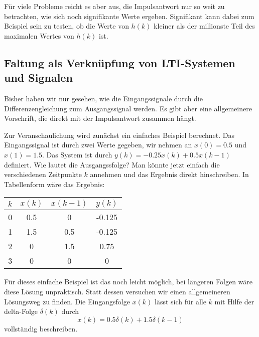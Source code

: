 Für viele Probleme reicht es aber aus, die Impulsantwort nur so
weit zu betrachten, wie sich noch signifikante Werte ergeben.
Signifikant kann dabei zum Beispiel sein zu testen, ob die Werte
von $h(k)$ kleiner als der millionste Teil des maximalen Wertes
von $h(k)$ ist.



\subsection{Faltung als Verknüpfung von LTI-Systemen und Signalen}
Bisher haben wir nur gesehen, wie die Eingangssignale durch die
Differenzengleichung zum Ausgangssignal werden. Es gibt aber eine
allgemeinere Vorschrift, die direkt mit der Impulsantwort zusammen
hängt.

Zur Veranschaulichung wird zunächst ein einfaches Beispiel berechnet.
Das Eingangssignal ist
durch zwei Werte gegeben, wir nehmen an $x(0)= 0.5$ und $x(1) =
1.5$. Das System ist durch $y(k) = -0.25x(k) + 0.5x(k-1)$
definiert. Wie lautet die Ausgangssfolge? Man könnte jetzt einfach
die verschiedenen Zeitpunkte $k$ annehmen und das Ergebnis direkt
hinschreiben. In Tabellenform wäre das Ergebnis:

\begin{center}
\begin{tabular}{|c|c|c|c|}\hline
$k$ & $x(k)$ & $x(k-1)$ & $y(k)$ \\\hline
0 & 0.5 & 0   & -0.125\\ \hline
1 & 1.5 & 0.5 & -0.125\\ \hline
2 &  0  & 1.5 &  0.75\\ \hline
3 &  0  &  0  &    0\\ \hline
\end{tabular}
\end{center}

Für dieses einfache Beispiel ist das noch leicht möglich, bei längeren Folgen
wäre diese Lösung unpraktisch.
Statt dessen versuchen wir einen allgemeineren
Lösungsweg zu finden. Die Eingangsfolge $x(k)$ lässt sich für alle $k$
mit Hilfe der delta-Folge $\delta(k)$ durch
\begin{equation}\label{eq:diracinput}
    x(k) = 0.5 \delta(k) +  1.5 \delta(k-1)
\end{equation}
vollständig beschreiben.

